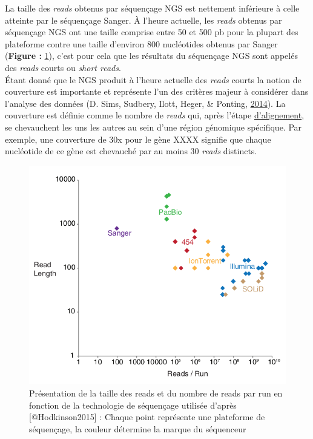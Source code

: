 \documentclass[12pt,twoside]{reedthesis}
\theoremstyle{definition}
\theoremstyle{definition}
\theoremstyle{remark}
\begin{document}
  La taille des \emph{reads} obtenus par séquençage NGS est nettement
  inférieure à celle atteinte par le séquençage Sanger. À l'heure
  actuelle, les \emph{reads} obtenus par séquençage NGS ont une taille
  comprise entre 50 et 500 pb pour la plupart des plateforme contre une
  taille d'environ 800 nucléotides obtenus par Sanger (\textbf{Figure :}
  \ref{fig:readPerRun}), c'est pour cela que les résultats du séquençage
  NGS sont appelés des \emph{reads} courts ou \emph{short reads}.\\
  Étant donné que le NGS produit à l'heure actuelle des \emph{reads}
  courts la notion de couverture est importante et représente l'un des
  critères majeur à considérer dans l'analyse des données (D. Sims,
  Sudbery, Ilott, Heger, \& Ponting,
  \protect\hyperlink{ref-Sims2014}{2014}). La couverture est définie comme
  le nombre de \emph{reads} qui, après l'étape
  \protect\hyperlink{lalignement}{d'alignement}, se chevauchent les uns
  les autres au sein d'une région génomique spécifique. Par exemple, une
  couverture de 30x pour le gène XXXX signifie que chaque nucléotide de ce
  gène est chevauché par au moins 30 \emph{reads} distincts.
  
  \newpage
  
  \begin{figure}
  
  {\centering \includegraphics[scale=.55]{figure/read_per_run} 
  
  }
  
  \caption[Présentation de la taille des reads et du nombre de reads par run en fonction de la technologie de séquençage utilisée]{Présentation de la taille des reads et du nombre de reads par run en fonction de la technologie de séquençage utilisée d'après [@Hodkinson2015] : Chaque point représente une plateforme de séquençage, la couleur détermine la marque du séquenceur}\label{fig:readPerRun}
  \end{figure}
  
\end{document}
